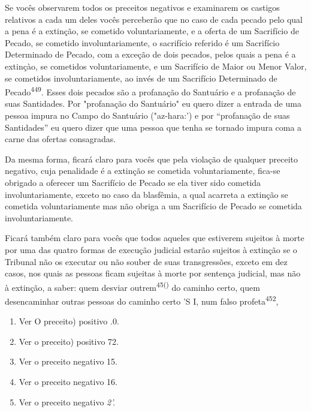 Se vocês observarem todos os preceitos negativos e examinarem os
castigos relativos a cada um deles vocês perceberão que no caso de cada
peca­do pelo qual a pena é a extinção, se cometido voluntariamente, e a
oferta de um Sacrifício de Pecado, se cometido involuntariamente, o
sacrifício referido é um Sacrifício Determinado de Pecado, com a exceção
de dois pecados, pelos quais a pena é a extinçào, se cometidos
voluntariamente, e um Sacrifício de Maior ou Menor Valor, se cometidos
involuntariamente, ao invés de um Sacri­fício Determinado de
Pecado\textsuperscript{449}. Esses dois pecados são a profanação do
San­tuário e a profanação de suas Santidades. Por "profanação do
Santuário" eu quero dizer a entrada de uma pessoa impura no Campo do
Santuário ("az-hara:') e por ``profanação de suas Santidades'' eu quero
dizer que uma pessoa que te­nha se tornado impura coma a carne das
ofertas consagradas.

Da mesma forma, ficará claro para vocês que pela violação de qual­quer
preceito negativo, cuja penalidade é a extinção se cometida
voluntaria­mente, fica-se obrigado a oferecer um Sacrifício de Pecado se
ela tiver sido co­metida involuntariamente, exceto no caso da blasfêmia,
a qual acarreta a extin­ção se cometida voluntariamente mas não obriga a
um Sacrifício de Pecado se cometida involuntariamente.

Ficará também claro para vocês que todos aqueles que estiverem su­jeitos
à morte por uma das quatro formas de execução judicial estarão sujeitos
à extinção se o Tribunal não os executar ou não souber de suas
transgressões, exceto em dez casos, nos quais as pessoas ficam sujeitas
à morte por sentença judicial, mas não à extinção, a saber: quem desviar
outrem\textsuperscript{45()} do caminho certo, quem desencaminhar outras
pessoas do caminho certo 'S I, num falso profeta\textsuperscript{452},


\begin{enumerate}
\def\labelenumi{\arabic{enumi}.}
\setcounter{enumi}{447}
\item
 
 Ver O preceito) positivo .0.
 
\item
 
 Ver o preceito) positivo 72.
 
\item
 
 Ver o preceito negativo 15.
 
\item
 
 Ver o preceito negativo 16.
 
\item
 
 Ver o preceito negativo \emph{2'.}
 
\end{enumerate}

